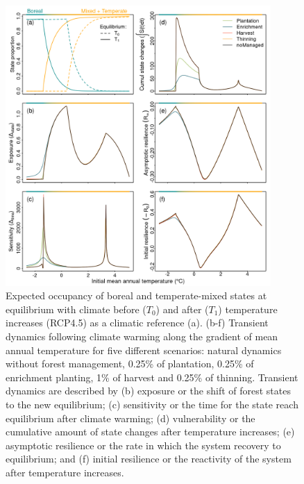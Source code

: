 \documentclass[12pt]{article}
\begin{document}
\begin{figure}
\hypertarget{fig:num-res1}{%
\centering
\includegraphics[width=0.9\textwidth,height=\textheight]{manuscript/img/num-result.png}
\caption{Expected occupancy of boreal and temperate-mixed states at
equilibrium with climate before (\(T_0\)) and after (\(T_1\))
temperature increases (RCP4.5) as a climatic reference (a). (b-f)
Transient dynamics following climate warming along the gradient of mean
annual temperature for five different scenarios: natural dynamics
without forest management, 0.25\% of plantation, 0.25\% of enrichment
planting, 1\% of harvest and 0.25\% of thinning. Transient dynamics are
described by (b) exposure or the shift of forest states to the new
equilibrium; (c) sensitivity or the time for the state reach equilibrium
after climate warming; (d) vulnerability or the cumulative amount of
state changes after temperature increases; (e) asymptotic resilience or
the rate in which the system recovery to equilibrium; and (f) initial
resilience or the reactivity of the system after temperature
increases.}\label{fig:num-res1}
}
\end{figure}
\end{document}
